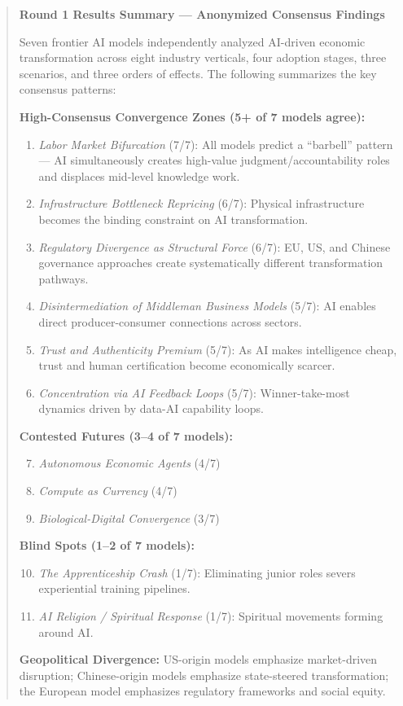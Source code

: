 \documentclass[preprint,review,12pt]{elsarticle}
\begin{document}
\begin{quote}
\textbf{Round 1 Results Summary --- Anonymized Consensus Findings}

Seven frontier AI models independently analyzed AI-driven economic transformation across eight industry verticals, four adoption stages, three scenarios, and three orders of effects. The following summarizes the key consensus patterns:

\textbf{High-Consensus Convergence Zones (5+ of 7 models agree):}
\begin{enumerate}
  \item \textit{Labor Market Bifurcation} (7/7): All models predict a ``barbell'' pattern --- AI simultaneously creates high-value judgment/accountability roles and displaces mid-level knowledge work.
  \item \textit{Infrastructure Bottleneck Repricing} (6/7): Physical infrastructure becomes the binding constraint on AI transformation.
  \item \textit{Regulatory Divergence as Structural Force} (6/7): EU, US, and Chinese governance approaches create systematically different transformation pathways.
  \item \textit{Disintermediation of Middleman Business Models} (5/7): AI enables direct producer-consumer connections across sectors.
  \item \textit{Trust and Authenticity Premium} (5/7): As AI makes intelligence cheap, trust and human certification become economically scarcer.
  \item \textit{Concentration via AI Feedback Loops} (5/7): Winner-take-most dynamics driven by data-AI capability loops.
\end{enumerate}

\textbf{Contested Futures (3--4 of 7 models):}
\begin{enumerate}
  \setcounter{enumi}{6}
  \item \textit{Autonomous Economic Agents} (4/7)
  \item \textit{Compute as Currency} (4/7)
  \item \textit{Biological-Digital Convergence} (3/7)
\end{enumerate}

\textbf{Blind Spots (1--2 of 7 models):}
\begin{enumerate}
  \setcounter{enumi}{9}
  \item \textit{The Apprenticeship Crash} (1/7): Eliminating junior roles severs experiential training pipelines.
  \item \textit{AI Religion / Spiritual Response} (1/7): Spiritual movements forming around AI.
\end{enumerate}

\textbf{Geopolitical Divergence:} US-origin models emphasize market-driven disruption; Chinese-origin models emphasize state-steered transformation; the European model emphasizes regulatory frameworks and social equity.
\end{quote}
\end{document}
